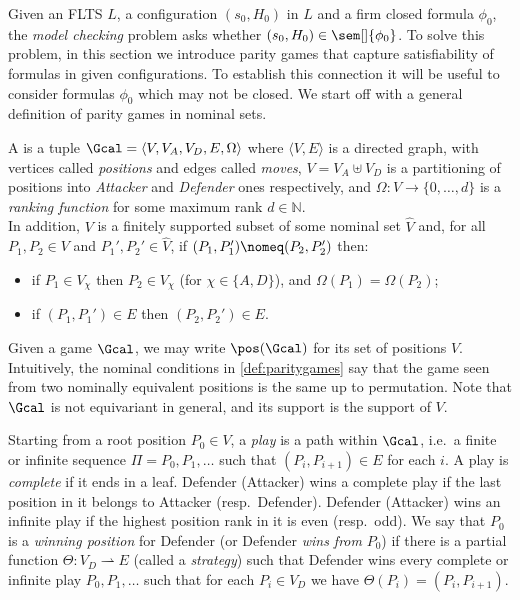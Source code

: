 \newcommand\ndb{qweqwe}
\renewcommand\fgame{\Gcal}
\newcommand\wellbound[1]{\triangleleft_{#1}}

Given an FLTS $L$, a configuration $(s_0,H_0)$ in $L$ and a firm closed formula $\phi_0$,
the \emph{model checking} problem asks whether $(s_0,H_0)\in\sem[]{\phi_0}$. To solve this problem, in this section we introduce parity games that capture satisfiability of formulas in given configurations. To establish this connection it will be useful to consider formulas $\phi_0$ which may not be closed.
We start off with a general definition of parity games in nominal sets.

\begin{definition}\label{def:paritygames}
  A  is a tuple $\Gcal=\langle V,V_A,V_D,E,\Omega\rangle$ where $\langle V,E\rangle$ is a directed graph, with vertices called \emph{positions} and edges called \emph{moves}, $V=V_A\uplus V_D$ is a partitioning of positions into \emph{Attacker} and \emph{Defender} ones respectively, and $\Omega:V\to\{0,\dots,d\}$ is a \emph{ranking function} for some maximum rank $d\in\mathbb{N}$.\\
  In addition, $V$ is a finitely supported subset of some nominal set $\hat V$ and, for all $P_1,P_2\in V$ and $P_1',P_2'\in\hat V$, if $(P_1,P_1')\nomeq (P_2,P_2')$ then:
  \begin{itemize}
  \item if $P_1\in V_\chi$ then $P_2\in V_\chi$ (for $\chi\in\{A,D\}$), and $\Omega(P_1)=\Omega(P_2)$;
  \item if $(P_1,P_1')\in E$ then $(P_2,P_2')\in E$.
  \end{itemize}
\end{definition}

Given a game $\Gcal$, we may write $\pos(\Gcal)$ for its set of positions $V$.
Intuitively, the nominal conditions in \cref{def:paritygames} say that the game seen from two nominally equivalent positions is the same up to permutation.
Note that $\Gcal$ is not equivariant in general, and its support is the support of $V$.

Starting from a root position $P_0\in V$, a \emph{play} is a path within $\Gcal$, i.e.\ a finite or infinite sequence $\Pi=P_0,P_1,\dots$ such that $(P_i,P_{i+1})\in E$ for each $i$. A play is \emph{complete} if it ends in a leaf. Defender (Attacker) wins a complete play if the last position in it belongs to Attacker (resp.~Defender). Defender (Attacker) wins an infinite play if the highest position rank in it is even (resp.~odd). We say that  $P_0$ is a \emph{winning position} for Defender (or Defender \emph{wins from} $P_0$) if there is a partial function $\Theta: V_D\rightharpoonup E$ (called a \emph{strategy}) such that Defender wins  every complete or infinite play $P_0,P_1,\dots$ such that for each $P_i\in V_D$ we have $\Theta(P_i)=(P_i,P_{i+1})$.

